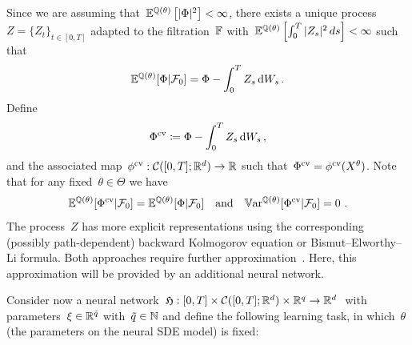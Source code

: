 Since we are assuming that~$\mathbb{E}^{\mathbb{Q}(\theta)}\left[|\Phi|^2\right]<\infty$, there exists a unique process~${Z=\{Z_t\}_{t\in[0,T]}}$
adapted to the filtration~$\mathbb{F}$ 
with~$\mathbb{E}^{\mathbb{Q}(\theta)}\left[ \int_0^T |Z_s|^2\,ds \right]<\infty$ such that 
\[
\mathbb{E}^{\mathbb{Q}(\theta)}[\Phi | \mathcal{F}_0] = \Phi - \int_0^T Z_s \, \mathrm{d} W_s\,.
\]
Define 
\[
\Phi^{\textup{cv}}\coloneqq  \Phi - \int_0^T Z_s\, \mathrm{d} W_s\,,
\]
and the associated map~$\phi^{\textup{cv}}:\mathcal{C}([0,T];\mathbb{R}^d) \to \mathbb{R}$ such that~$\Phi^{\textup{cv}}=\phi^{\textup{cv}}(X^\theta)$. Note that for any fixed~$\theta\in\Theta$ we have
\[
\mathbb{E}^{\mathbb{Q}(\theta)}[ \Phi^{\textup{cv}} | \mathcal{F}_0] = \mathbb{E}^{\mathbb{Q}(\theta)}[\Phi | \mathcal{F}_0] \quad \text{and} \quad \mathbb{V}\mathrm{ar}^{\mathbb{Q}(\theta)}[\Phi^{\textup{cv}} | \mathcal{F}_0 ]  = 0~.
\]
The process~$Z$ has more explicit representations using the corresponding (possibly path-dependent) backward Kolmogorov equation or Bismut--Elworthy--Li formula. Both approaches require further approximation~\cite{Vidales2018UnbiasedPDEs, Vidales2020LearningNetworks}.
Here, this approximation will be provided by an additional neural network. 

Consider now a neural network~$\mathfrak{H} : [0, T] \times \mathcal{C}([0, T];\mathbb{R}^d) \times \mathbb{R}^q  \to \mathbb{R}^d~$ with parameters~$\xi \in \mathbb{R}^{\tilde q}$ with~$\tilde q\in \mathbb{N}$  and define the following learning task, in which~$\theta$ (the parameters on the neural SDE model) is fixed: 

